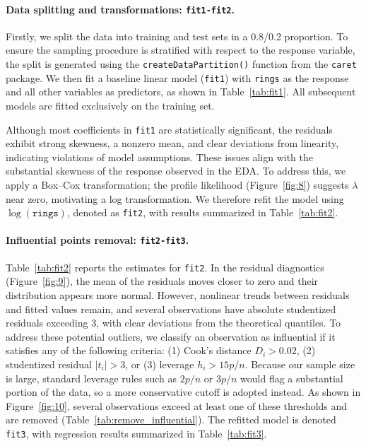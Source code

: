\documentclass[12pt]{article}
\begin{document}
	\paragraph{Data splitting and transformations: \texttt{fit1-fit2}.} Firstly, we split the data into training and test sets in a 0.8/0.2 proportion. To ensure the sampling procedure is stratified with respect to the response variable, the split is generated using the \texttt{createDataPartition()} function from the \texttt{caret} package. We then fit a baseline linear model (\texttt{fit1}) with \texttt{rings} as the response and all other variables as predictors, as shown in Table~\ref{tab:fit1}. All subsequent models are fitted exclusively on the training set.
	
	Although most coefficients in \texttt{fit1} are statistically significant, the residuals exhibit strong skewness, a nonzero mean, and clear deviations from linearity, indicating violations of model assumptions. These issues align with the substantial skewness of the response observed in the EDA. To address this, we apply a Box–Cox transformation; the profile likelihood (Figure~\ref{fig:8}) suggests $\lambda$ near zero, motivating a log transformation. We therefore refit the model using $\log(\texttt{rings})$, denoted as \texttt{fit2}, with results summarized in Table~\ref{tab:fit2}.
	
	\paragraph{Influential points removal: \texttt{fit2-fit3}.} 
	Table~\ref{tab:fit2} reports the estimates for \texttt{fit2}. In the residual diagnostics (Figure~\ref{fig:9}), the mean of the residuals moves closer to zero and their distribution appears more normal. However, nonlinear trends between residuals and fitted values remain, and several observations have absolute studentized residuals exceeding 3, with clear deviations from the theoretical quantiles. To address these potential outliers, we classify an observation as influential if it satisfies any of the following criteria: (1) Cook’s distance $D_i > 0.02$, (2) studentized residual $|t_i| > 3$, or (3) leverage $h_i > 15p/n$. Because our sample size is large, standard leverage rules such as $2p/n$ or $3p/n$ would flag a substantial portion of the data, so a more conservative cutoff is adopted instead. As shown in Figure~\ref{fig:10}, several observations exceed at least one of these thresholds and are removed (Table~\ref{tab:remove_influential}). The refitted model is denoted \texttt{fit3}, with regression results summarized in Table~\ref{tab:fit3}.
	
\end{document}
